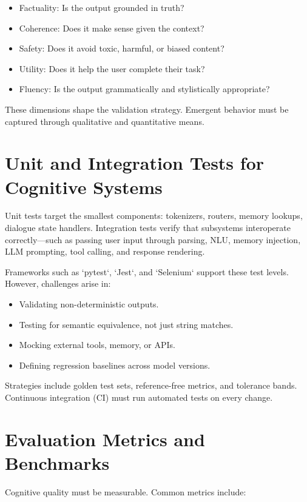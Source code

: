 \documentclass{book}
\begin{document}
\begin{itemize}
  \item Factuality: Is the output grounded in truth?
  \item Coherence: Does it make sense given the context?
  \item Safety: Does it avoid toxic, harmful, or biased content?
  \item Utility: Does it help the user complete their task?
  \item Fluency: Is the output grammatically and stylistically appropriate?
\end{itemize}

These dimensions shape the validation strategy. Emergent behavior must be captured through qualitative and quantitative means.

\section{Unit and Integration Tests for Cognitive Systems}

Unit tests target the smallest components: tokenizers, routers, memory lookups, dialogue state handlers. Integration tests verify that subsystems interoperate correctly—such as passing user input through parsing, NLU, memory injection, LLM prompting, tool calling, and response rendering.

Frameworks such as `pytest`, `Jest`, and `Selenium` support these test levels. However, challenges arise in:

\begin{itemize}
  \item Validating non-deterministic outputs.
  \item Testing for semantic equivalence, not just string matches.
  \item Mocking external tools, memory, or APIs.
  \item Defining regression baselines across model versions.
\end{itemize}

Strategies include golden test sets, reference-free metrics, and tolerance bands. Continuous integration (CI) must run automated tests on every change.

\section{Evaluation Metrics and Benchmarks}

Cognitive quality must be measurable. Common metrics include:
\end{document}
